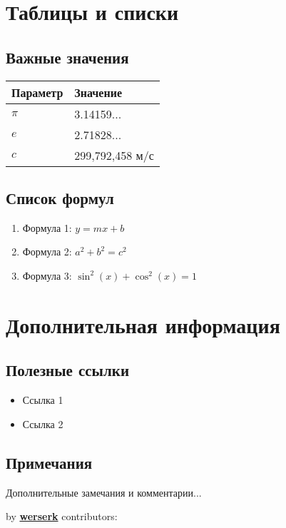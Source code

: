 \documentclass[10pt,landscape,a4paper]{article}
\begin{document}
\begin{multicols}{2}
\section{Таблицы и списки}

\subsection{Важные значения}
\begin{center}
\begin{tabular}{@{}ll@{}}
\toprule
Параметр & Значение \\
\midrule
$\pi$ & 3.14159... \\
$e$ & 2.71828... \\
$c$ & 299,792,458 м/с \\
\bottomrule
\end{tabular}
\end{center}

\subsection{Список формул}
\begin{enumerate}
    \item Формула 1: $y = mx + b$
    \item Формула 2: $a^2 + b^2 = c^2$
    \item Формула 3: $\sin^2(x) + \cos^2(x) = 1$
\end{enumerate}

\section{Дополнительная информация}

\subsection{Полезные ссылки}
\begin{itemize}
    \item Ссылка 1
    \item Ссылка 2
\end{itemize}

\subsection{Примечания}
Дополнительные замечания и комментарии...

\end{multicols}

{\noindent by \href{https://werserk.com}{\textcolor{accent}{\textbf{werserk}}} \hfill contributors: \texttt{\contributors}}
\end{document}
